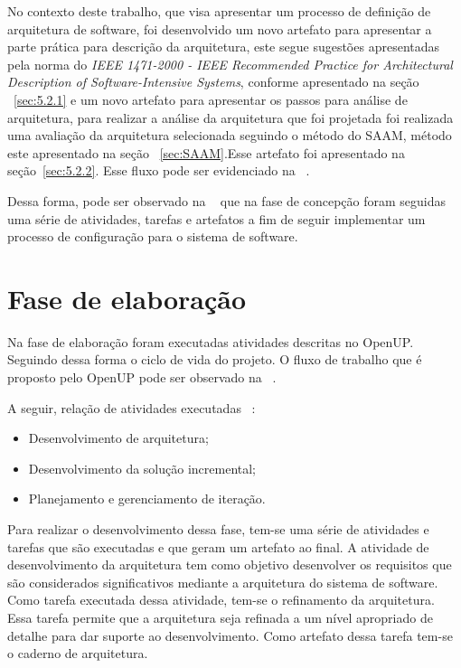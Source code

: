 No contexto deste trabalho, que visa apresentar um processo de definição de arquitetura de software, foi desenvolvido um novo artefato para apresentar a parte prática para descrição da arquitetura, este segue sugestões apresentadas pela norma do \emph{IEEE 1471-2000 - IEEE Recommended Practice for Architectural Description of Software-Intensive Systems}, conforme apresentado na seção ~\ref{sec:5.2.1} e um novo artefato para apresentar os passos para análise de arquitetura, para realizar a análise da arquitetura que foi projetada foi realizada uma avaliação da arquitetura selecionada seguindo o método do \acrfull{SAAM}, método este apresentado na seção ~\ref{sec:SAAM}.Esse artefato foi apresentado na seção~\ref{sec:5.2.2}.
Esse fluxo pode ser evidenciado na ~.

%

%

Dessa forma, pode ser observado na ~ que na fase de concepção foram seguidas uma série de atividades, tarefas e artefatos a fim de seguir implementar um processo de configuração para o sistema de software.

\section{Fase de elaboração}
Na fase de elaboração foram executadas atividades descritas no \acrfull{OpenUP}. Seguindo dessa forma o ciclo de vida do projeto. O fluxo de trabalho que é proposto pelo \acrfull{OpenUP} pode ser observado na ~.

%

A seguir, relação de atividades executadas ~\cite{openup}:

\begin{itemize}
    \item Desenvolvimento de arquitetura;
    \item Desenvolvimento da solução incremental;
    \item Planejamento e gerenciamento de iteração.
\end{itemize}

Para realizar o desenvolvimento dessa fase, tem-se uma série de atividades e tarefas que são executadas e que geram um artefato ao final. 
A atividade de desenvolvimento da arquitetura tem como objetivo desenvolver os requisitos que são considerados significativos mediante a arquitetura do sistema de software. Como tarefa executada dessa atividade, tem-se o refinamento da arquitetura.
Essa tarefa permite que a arquitetura seja refinada a um nível apropriado de detalhe para dar suporte ao desenvolvimento. Como artefato dessa tarefa tem-se o caderno de arquitetura.

